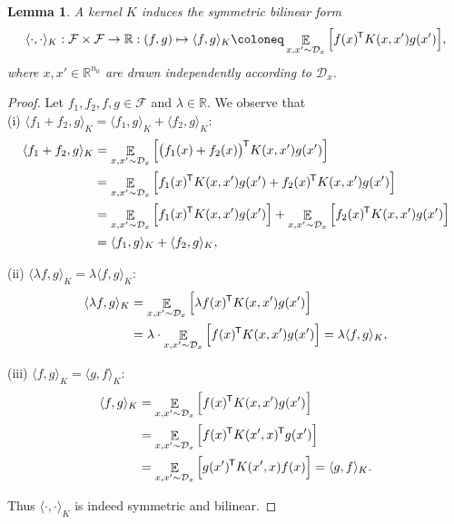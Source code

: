 \documentclass[11pt, a4paper]{article}
\newtheorem{lemma}[theorem]{Lemma}
\newcommand{\R}{\mathbb{R}}
\newcommand{\D}{\mathcal{D}}
\newcommand{\F}{\mathcal{F}}
\newcommand*{\tr}{^{\mkern-1.5mu\mathsf{T}}}
\DeclareMathOperator*{\E}{\mathbb{E}}
\begin{document}
\begin{lemma} \label{lem:form}
A kernel $K$ induces the symmetric bilinear form
\[ \langle \cdot, \cdot \rangle_K : \F \times \F \to \R : (f,g) \mapsto \langle f , g \rangle _K \coloneq \E_{x,x' \sim \D_x} \Big [ f(x)\tr  K(x,x') g(x') \Big ], \]
where $x, x' \in \R^{n_0}$ are drawn independently according to $\D_x$. 
\end{lemma}

\begin{proof}
Let $f_1, f_2, f, g \in \F$ and $\lambda \in \R$. We observe that \\

(i) $\langle f_1 + f_2 , g \rangle_{K} = \langle f_1 , g \rangle_{K} + \langle f_2 , g \rangle_{K}$:
\[ \begin{split}
\langle f_1 + f_2 , g \rangle_{K}
&= \E_{x,x' \sim \D_x} \Big [ \big ( f_1(x) + f_2(x) \big )\tr K(x,x')g(x') \Big ] \\\
&= \E_{x,x' \sim \D_x} \Big [ f_1(x)\tr K(x,x')g(x') + f_2(x)\tr K(x,x')g(x') \Big ] \\\
&= \E_{x,x' \sim \D_x} \Big [ f_1(x)\tr K(x,x')g(x') \Big ] + \E_{x,x' \sim \D_x} \Big [ f_2(x)\tr K(x,x')g(x') \Big ] \\\
&= \langle f_1 , g \rangle_{K} + \langle f_2 , g \rangle_{K},
\end{split} \]

(ii) $\langle \lambda f , g \rangle_{K} = \lambda \langle f, g \rangle_{K}$:
\[ \begin{split} 
\langle \lambda f , g \rangle_{K} 
&= \E_{x,x' \sim \D_x} \Big [ \lambda f(x)\tr K(x,x')g(x') \Big ] \\\
&= \lambda \cdot \E_{x,x' \sim \D_x} \Big [ f(x)\tr K(x,x')g(x') \Big ] = \lambda \langle f, g \rangle_{K}, 
\end{split} \]

(iii) $\langle f , g \rangle_{K} = \langle g , f \rangle_{K}$:
\[ \begin{split} \langle f , g \rangle_{K} 
&= \E_{x,x' \sim \D_x} \Big [ f(x)\tr K(x,x')g(x') \Big ] \\\
&= \E_{x,x' \sim \D_x} \Big [ f(x)\tr K(x',x)\tr g(x') \Big ] \\\
&= \E_{x,x' \sim \D_x} \Big [ g(x')\tr K(x',x)f(x) \Big ] = \langle g , f \rangle_{K}.
\end{split} \]

Thus $\langle \cdot,\cdot \rangle_{K}$ is indeed symmetric and bilinear.
\end{proof}
\end{document}
